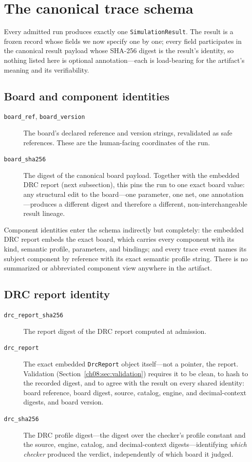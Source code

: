 \section{The canonical trace schema}\label{ch08:sec:schema}

Every admitted run produces exactly one \texttt{SimulationResult}. The result is a frozen record whose fields we now specify one by one; every field participates in the canonical result payload whose SHA-256 digest is the result's identity, so nothing listed here is optional annotation---each is load-bearing for the artifact's meaning and its verifiability.

\subsection{Board and component identities}

\begin{description}
\item[\texttt{board\_ref}, \texttt{board\_version}] The board's declared reference and version strings, revalidated as safe references. These are the human-facing coordinates of the run.
\item[\texttt{board\_sha256}] The digest of the canonical board payload. Together with the embedded DRC report (next subsection), this pins the run to one exact board value: any structural edit to the board---one parameter, one net, one annotation---produces a different digest and therefore a different, non-interchangeable result lineage.
\end{description}

Component identities enter the schema indirectly but completely: the embedded DRC report embeds the exact board, which carries every component with its kind, semantic profile, parameters, and bindings; and every trace event names its subject component by reference with its exact semantic profile string. There is no summarized or abbreviated component view anywhere in the artifact.

\subsection{DRC report identity}

\begin{description}
\item[\texttt{drc\_report\_sha256}] The report digest of the DRC report computed at admission.
\item[\texttt{drc\_report}] The exact embedded \texttt{DrcReport} object itself---not a pointer, the report. Validation (Section~\ref{ch08:sec:validation}) requires it to be clean, to hash to the recorded digest, and to agree with the result on every shared identity: board reference, board digest, source, catalog, engine, and decimal-context digests, and board version.
\item[\texttt{drc\_sha256}] The DRC profile digest---the digest over the checker's profile constant and the source, engine, catalog, and decimal-context digests---identifying \emph{which checker} produced the verdict, independently of which board it judged.
\end{description}

